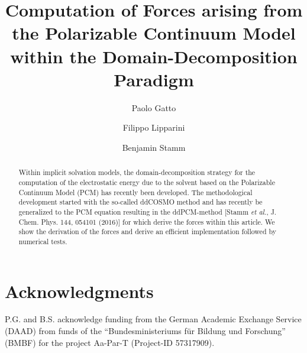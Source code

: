 \documentclass[aip,jcp,a4paper]{revtex4-1}
\begin{document}
\title{Computation of Forces arising from the Polarizable Continuum Model within the Domain-Decomposition Paradigm}

\author{Paolo Gatto}
\affiliation{}

\author{Filippo Lipparini}
\affiliation{}

\author{Benjamin Stamm}
\affiliation{}



\begin{abstract}
Within implicit solvation models, the domain-decomposition strategy for the computation of the electrostatic energy due to the solvent based on the Polarizable Continuum Model (PCM) has recently been developed. 
The methodological development started with the so-called ddCOSMO method and has recently be generalized to the PCM equation resulting in the ddPCM-method [Stamm {\it et al.}, J. Chem. Phys. 144, 054101 (2016)] for which derive the forces within this article. 
We show the derivation of the forces and derive an efficient implementation followed by numerical tests.

\end{abstract}

\maketitle


%






\section*{Acknowledgments}
P.G. and B.S. acknowledge funding from the German Academic Exchange Service (DAAD) from funds of the ``Bundesministeriums f\"ur Bildung und Forschung'' (BMBF) for the project Aa-Par-T (Project-ID 57317909).
\appendix


%




\end{document}

